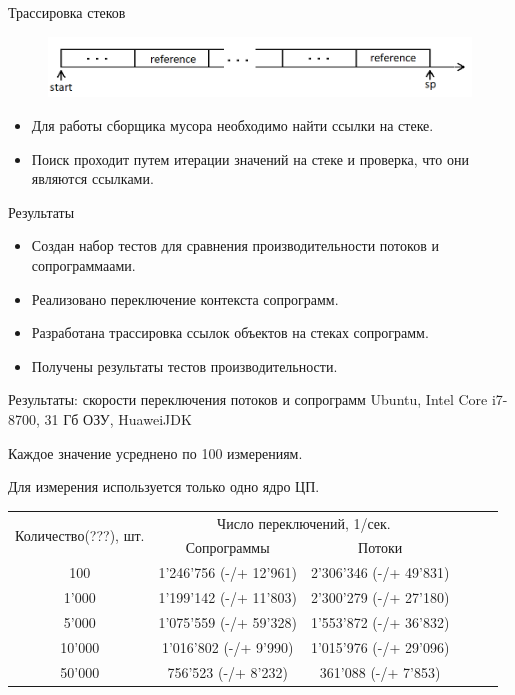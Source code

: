 \begin{frame}{Трассировка стеков}
	\begin{figure}
		\includegraphics[scale=0.5]{images/stack.png}
	\end{figure}

	\begin{itemize}
		\item Для работы сборщика мусора необходимо найти ссылки на стеке.
		\item Поиск проходит путем итерации значений на стеке и проверка, что они являются ссылками.
	\end{itemize}
\end{frame}	
	
\begin{frame}{Результаты}
	\begin{itemize}
		\item Создан набор тестов для сравнения производительности потоков и сопрограммаами.
		\item Реализовано переключение контекста сопрограмм.
		\item Разработана трассировка ссылок объектов на стеках сопрограмм.
		\item Получены результаты тестов производительности.
	\end{itemize}
\end{frame}

\begin{frame}{Результаты: скорости переключения потоков и сопрограмм}
	Ubuntu, Intel Core i7-8700, 31 Гб ОЗУ, HuaweiJDK
	\par Каждое значение усреднено по 100 измерениям. 
	\par Для измерения используется только одно ядро ЦП.
	\begin{table}[H]
		\begin{tabular}{|c|c|c|c|c|c|}
			\hline \multirow{2}{*}{Количество(???), шт.} & \multicolumn{2}{|c|}{Число переключений, 1/сек.}    \\
			\cline{2-3}    & Сопрограммы            & Потоки                  \\
			\hline 100     & 1'246'756 (-/+ 12'961) & 2'306'346 (-/+ 49'831)  \\
			\hline 1'000   & 1'199'142 (-/+ 11'803) & 2'300'279 (-/+ 27'180)  \\
			\hline 5'000   & 1'075'559 (-/+ 59'328) & 1'553'872 (-/+ 36'832)  \\
			\hline 10'000  & 1'016'802 (-/+ 9'990)  & 1'015'976 (-/+ 29'096)  \\ 
			\hline 50'000  & 756'523 (-/+ 8'232)    & 361'088 (-/+ 7'853)     \\ 
			\hline 
		\end{tabular}
	\end{table}
	
\end{frame}


